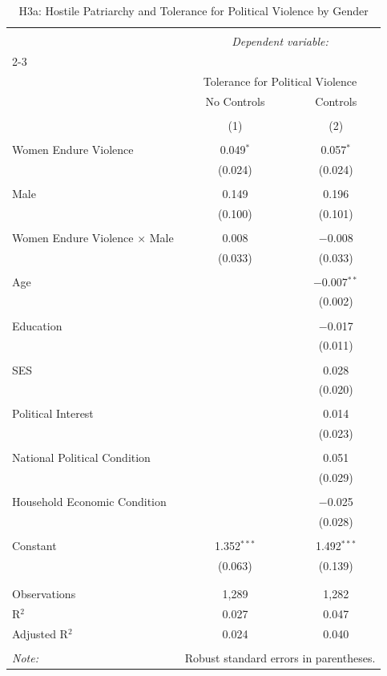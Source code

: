 
\begin{table}[!htbp] \centering 
  \caption{H3a: Hostile Patriarchy and Tolerance for Political Violence by Gender} 
  \label{tab:h3a} 
\begin{tabular}{@{\extracolsep{5pt}}lcc} 
\\[-1.8ex]\hline 
\hline \\[-1.8ex] 
 & \multicolumn{2}{c}{\textit{Dependent variable:}} \\ 
\cline{2-3} 
\\[-1.8ex] & \multicolumn{2}{c}{Tolerance for Political Violence} \\ 
 & No Controls & Controls \\ 
\\[-1.8ex] & (1) & (2)\\ 
\hline \\[-1.8ex] 
 Women Endure Violence & 0.049$^{*}$ & 0.057$^{*}$ \\ 
  & (0.024) & (0.024) \\ 
  & & \\ 
 Male & 0.149 & 0.196 \\ 
  & (0.100) & (0.101) \\ 
  & & \\ 
 Women Endure Violence × Male & 0.008 & $-$0.008 \\ 
  & (0.033) & (0.033) \\ 
  & & \\ 
 Age &  & $-$0.007$^{**}$ \\ 
  &  & (0.002) \\ 
  & & \\ 
 Education &  & $-$0.017 \\ 
  &  & (0.011) \\ 
  & & \\ 
 SES &  & 0.028 \\ 
  &  & (0.020) \\ 
  & & \\ 
 Political Interest &  & 0.014 \\ 
  &  & (0.023) \\ 
  & & \\ 
 National Political Condition &  & 0.051 \\ 
  &  & (0.029) \\ 
  & & \\ 
 Household Economic Condition &  & $-$0.025 \\ 
  &  & (0.028) \\ 
  & & \\ 
 Constant & 1.352$^{***}$ & 1.492$^{***}$ \\ 
  & (0.063) & (0.139) \\ 
  & & \\ 
\hline \\[-1.8ex] 
Observations & 1,289 & 1,282 \\ 
R$^{2}$ & 0.027 & 0.047 \\ 
Adjusted R$^{2}$ & 0.024 & 0.040 \\ 
\hline 
\hline \\[-1.8ex] 
\textit{Note:}  & \multicolumn{2}{r}{Robust standard errors in parentheses.} \\ 
\end{tabular} 
\end{table} 
